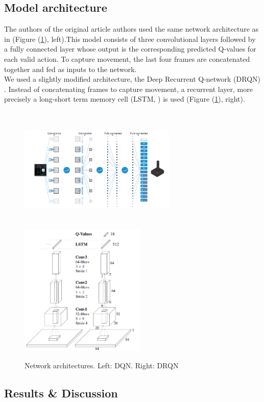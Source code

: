\documentclass{article}
\begin{document}
\subsection*{Model architecture}

The authors of the original article authors used the same network architecture
as in \citet{mnih2015} (Figure (\ref{dnn}), left).This model
consists of three convolutional layers followed by a fully connected layer whose
output is the corresponding predicted Q-values for each valid action.
To capture movement, the last four frames are concatenated together and fed
as inputs to the network.\\

We used a slightly modified architecture,
the Deep Recurrent Q-network (DRQN) \citep{DBLP:journals/corr/HausknechtS15}.
Instead of concatenating frames to capture movement, a recurrent layer, more
precisely a long-short term memory cell (LSTM, \cite{hochreiter1997}) is used
(Figure (\ref{dnn}), right).

\begin{figure}[H]
	\centering
	\includegraphics[width = 7.5cm,height = 6cm]{dqn}
	\includegraphics[width = 6cm]{drqn}
        \caption{Network architectures. Left: DQN. Right: DRQN}
	\label{dnn}
\end{figure}

\subsection*{Results \& Discussion}
\end{document}

